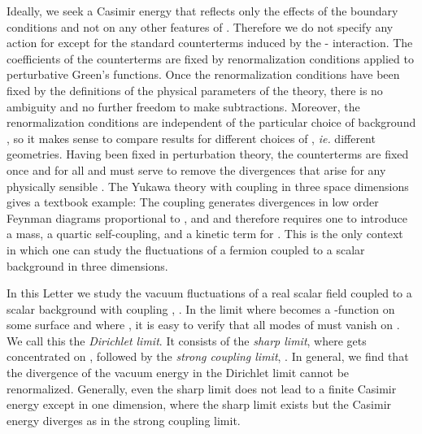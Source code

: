 \documentclass[a4paper,aps,amsfonts,prl,showpacs,nobibnotes,nofootinbib,%
tightenlines,twocolumn]{revtex4}
\providecommand{\vek}[1]{\mathbf{#1}}
\begin{document}
Ideally, we seek a Casimir energy that reflects only the effects
of the boundary conditions and not on any other features of
\myHighlight{$\sigma(\vek x)$}\coordHE{}.  Therefore we do not specify any action for \myHighlight{$\sigma$}\coordHE{}
except for the standard counterterms induced by the \myHighlight{$\phi$}\coordHE{}-\myHighlight{$\sigma$}\coordHE{}
interaction.  The coefficients of the counterterms are fixed by
renormalization conditions applied to perturbative Green's functions. 
Once the renormalization conditions have been fixed by the
definitions of the physical parameters of the theory, there is no
ambiguity and no further freedom to make subtractions. Moreover, the
renormalization conditions are independent of the particular choice of
background \myHighlight{$\sigma(\vek x)$}\coordHE{}, so it makes sense to compare results
for different choices of \myHighlight{$\sigma(\vek x)$}\coordHE{}, {\it ie.\/} different
geometries.  Having been fixed in perturbation theory, the
counterterms are fixed once and for all and must serve to remove the
divergences that arise for any physically sensible \myHighlight{$\sigma(\vek x)$}\coordHE{}. 
The Yukawa theory with coupling \coordHE{} in three space dimensions gives a
textbook example: The \coordHE{} coupling generates
divergences in low order Feynman diagrams proportional to
\coordHE{}, \coordHE{} and \coordHE{} and therefore
requires one to introduce a mass, a quartic self-coupling, and a
kinetic term for \myHighlight{$\sigma$}\coordHE{}.  This is the only context in which one can
study the fluctuations of a fermion coupled to a scalar background in
three dimensions.

In this Letter we study the vacuum fluctuations of a real scalar field
\myHighlight{$\phi$}\coordHE{} coupled to a scalar background \myHighlight{$\sigma(\vek x)$}\coordHE{} with coupling
\myHighlight{$\lambda$}\coordHE{}, \myHighlight{$\mathcal{L}_{\rm int}(\phi,\sigma)=\frac{1}{2}\lambda\,
\sigma(\vek{x})\,\phi^{2}(\vek{x},t)$}\coordHE{}.  In the limit where
\myHighlight{$\sigma(\vek x)$}\coordHE{} becomes a \myHighlight{$\delta$}\coordHE{}-function on some surface \coordHE{} and where \myHighlight{$\lambda\to\infty$}\coordHE{}, it is easy to verify that all modes
of \myHighlight{$\phi$}\coordHE{} must vanish on \coordHE{}.  We call this the \emph{Dirichlet
limit}.  It consists of the \emph{sharp limit}, where
\myHighlight{$\sigma(\vek{x})$}\coordHE{} gets concentrated on \coordHE{}, followed by the
\emph{strong coupling limit}, \myHighlight{$\lambda\to \infty$}\coordHE{}.  In general, we
find that the divergence of the vacuum energy in the Dirichlet limit
cannot be renormalized.  Generally, even the sharp limit does
not lead to a finite Casimir energy except in one dimension, where the
sharp limit exists but the Casimir energy diverges as
\myHighlight{$\lambda\ln \lambda$}\coordHE{} in the strong coupling limit.
\end{document}
